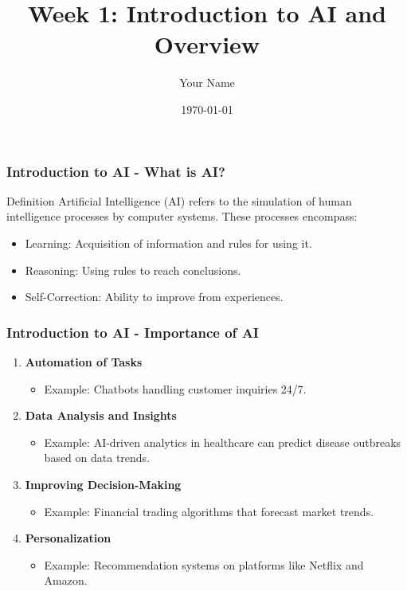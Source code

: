 \documentclass{beamer}
\title{Week 1: Introduction to AI and Overview}
\author{Your Name}
\institute{Your Institution}
\date{\today}
\begin{document}
\frame{\titlepage}

\begin{frame}[fragile]
    \frametitle{Introduction to AI - What is AI?}
    \begin{block}{Definition}
        Artificial Intelligence (AI) refers to the simulation of human intelligence processes by computer systems. These processes encompass:
        \begin{itemize}
            \item Learning: Acquisition of information and rules for using it.
            \item Reasoning: Using rules to reach conclusions.
            \item Self-Correction: Ability to improve from experiences.
        \end{itemize}
    \end{block}
\end{frame}

\begin{frame}[fragile]
    \frametitle{Introduction to AI - Importance of AI}
    \begin{enumerate}
        \item \textbf{Automation of Tasks} 
            \begin{itemize}
                \item Example: Chatbots handling customer inquiries 24/7.
            \end{itemize}

        \item \textbf{Data Analysis and Insights} 
            \begin{itemize}
                \item Example: AI-driven analytics in healthcare can predict disease outbreaks based on data trends.
            \end{itemize}

        \item \textbf{Improving Decision-Making} 
            \begin{itemize}
                \item Example: Financial trading algorithms that forecast market trends.
            \end{itemize}

        \item \textbf{Personalization} 
            \begin{itemize}
                \item Example: Recommendation systems on platforms like Netflix and Amazon.
            \end{itemize}
    \end{enumerate}
\end{frame}
\end{document}

